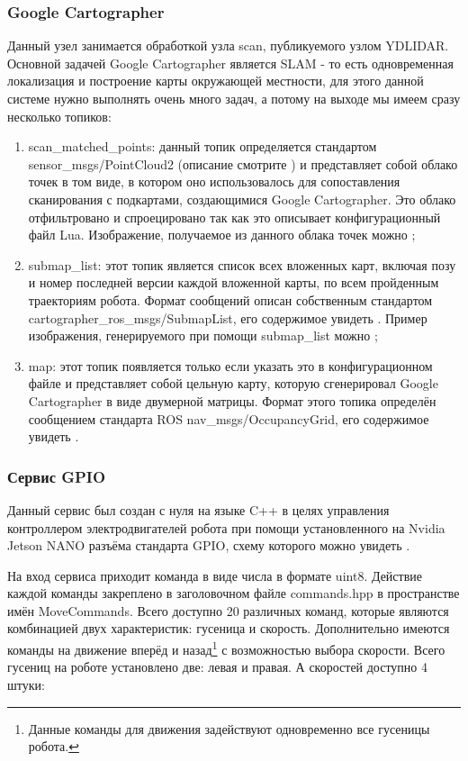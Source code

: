 \subsubsection{Google Cartographer}
Данный узел занимается обработкой узла scan, публикуемого узлом YDLIDAR. Основной задачей Google Cartographer является SLAM - то есть одновременная локализация и построение карты окружающей местности, для этого данной системе нужно выполнять очень много задач, а потому на выходе мы имеем сразу несколько топиков:
\begin{enumerate}
\item scan\_matched\_points: данный топик определяется стандартом sensor\_msgs/PointCloud2 (описание смотрите ) и представляет собой облако точек в том виде, в котором оно использовалось для сопоставления сканирования с подкартами, создающимися Google Cartographer. Это облако отфильтровано и спроецировано так как это описывает конфигурационный файл Lua. Изображение, получаемое из данного облака точек можно ;
\item submap\_list: этот топик является список всех вложенных карт, включая позу и номер последней версии каждой вложенной карты, по всем пройденным траекториям робота. Формат сообщений описан собственным стандартом cartographer\_ros\_msgs/SubmapList, его содержимое увидеть . Пример изображения, генерируемого при помощи submap\_list можно ;
\item map: этот топик появляется только если указать это в конфигурационном файле и представляет собой цельную карту, которую сгенерировал Google Cartographer в виде двумерной матрицы. Формат этого топика определён сообщением стандарта ROS nav\_msgs/OccupancyGrid, его содержимое увидеть .
\end{enumerate}

\subsubsection{Сервис GPIO}
Данный сервис был создан с нуля на языке C++ в целях управления контроллером электродвигателей робота при помощи установленного на Nvidia Jetson NANO разъёма стандарта GPIO, схему которого можно увидеть .

На вход сервиса приходит команда в виде числа в формате uint8. Действие каждой команды закреплено в заголовочном файле commands.hpp в пространстве имён MoveCommands. Всего доступно 20 различных команд, которые являются комбинацией двух характеристик: гусеница и скорость. Дополнительно имеются команды на движение вперёд и назад\footnote{Данные команды для движения задействуют одновременно все гусеницы робота.} с возможностью выбора скорости. Всего гусениц на роботе установлено две: левая и правая. А скоростей доступно 4 штуки:

